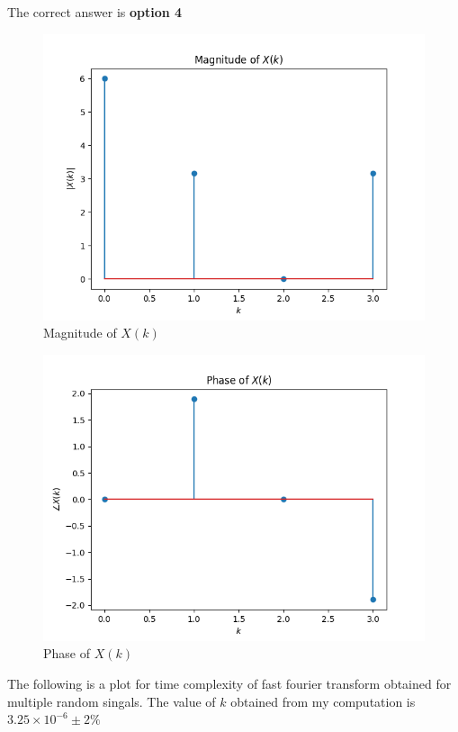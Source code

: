 \documentclass[journal,12pt,twocolumn]{IEEEtran}
\begin{document}
The correct answer is \textbf{option 4}
\begin{figure}[!ht]
    \centering
    \includegraphics[width=\columnwidth]{plot/magnitude}
    \caption{Magnitude of $X(k)$}
    \label{magnitude}
\end{figure}
\begin{figure}[H]
    \centering
    \includegraphics[width=\columnwidth]{plot/phase}
    \caption{Phase of $X(k)$}
    \label{magnitude}
\end{figure}
The following is a plot for time complexity of fast fourier transform obtained for multiple random singals.
The value of $k$ obtained from my computation is $3.25\times 10^{-6} \pm 2\%$
\end{document}
